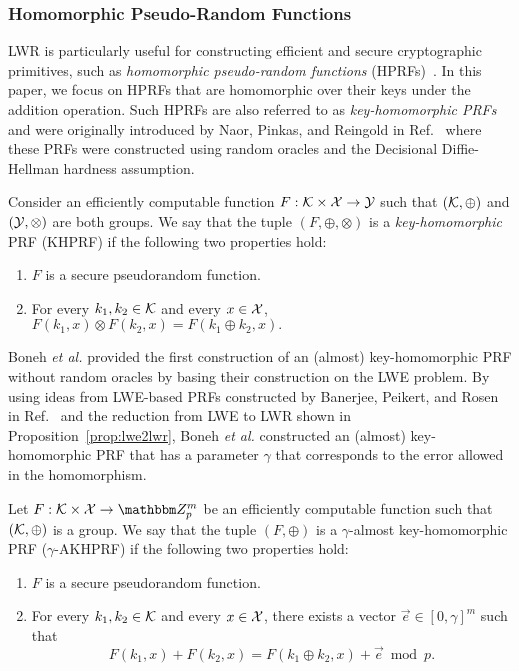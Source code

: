\subsubsection{Homomorphic Pseudo-Random Functions}
LWR is particularly useful for constructing efficient and secure cryptographic primitives, such as \emph{homomorphic pseudo-random functions} (HPRFs)~\cite{boneh2013key}.
In this paper, we focus on HPRFs that are homomorphic over their keys under the addition operation.
Such HPRFs are also referred to as \emph{key-homomorphic PRFs} and were originally introduced by Naor, Pinkas, and Reingold in Ref.~\cite{naor1999distributed} where these PRFs were constructed using random oracles and the Decisional Diffie-Hellman hardness assumption.

\begin{definition}
	Consider an efficiently computable function $F: \mathcal{K} \times \mathcal{X} \to \mathcal{Y}$ such that $(\mathcal{K}, \oplus)$ and $(\mathcal{Y}, \otimes)$ are both groups.
	We say that the tuple $(F, \oplus, \otimes)$ is a \emph{key-homomorphic} PRF (KHPRF) if the following two properties hold:
	\begin{enumerate}
		\item $F$ is a secure pseudorandom function.
		\item For every $k_1, k_2 \in \mathcal{K}$ and every $x \in \mathcal{X}$, $F\left(k_1, x\right) \otimes F\left(k_2, x\right) = F\left(k_1 \oplus k_2, x\right).$
	\end{enumerate}
	\end{definition}

Boneh \emph{et al.} provided the first construction of an (almost) key-homomorphic PRF without random oracles by basing their construction on the LWE problem.
By using ideas from LWE-based PRFs constructed by Banerjee, Peikert, and Rosen in Ref.~\cite{banerjee2012pseudorandom} and the reduction from LWE to LWR shown in Proposition~\ref{prop:lwe2lwr}, Boneh \emph{et al.} constructed an (almost) key-homomorphic PRF that has a parameter $\gamma$ that corresponds to the error allowed in the homomorphism.

\begin{definition}\label{def:akhprf}
	Let $F:\calK \times \calX \to \Z_p^m$ be an efficiently computable function such that $(\mathcal{K}, \oplus)$ is a group.
	We say that the tuple $(F, \oplus)$ is a $\gamma$-almost key-homomorphic PRF ($\gamma$-AKHPRF) if the following two properties hold:
	\begin{enumerate}
		\item $F$ is a secure pseudorandom function.
		\item For every $k_1, k_2 \in \mathcal{K}$ and every $x \in \mathcal{X}$, there exists a vector $\vec{e} \in [0, \gamma]^{m}$ such that 
		\[F\left(k_1, x\right) + F\left(k_2, x\right) = F\left(k_1 \oplus k_2, x\right) + \vec{e} \bmod p.\]
	\end{enumerate}
\end{definition}

